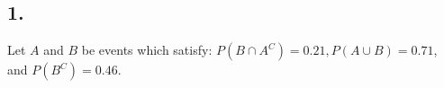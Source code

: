 

\renewcommand\assignment{Worksheet 7, due Friday 3 February, 4:15pm}

\def\firstcircle{(0:1.75cm) circle (2.5cm)}
\def\secondcircle{(180:1.75cm) circle (2.5cm)}



    \subsection*{1.}
    Let $A$ and $B$ be events which satisfy: $P (B \cap A^C) = 0.21, P (A \cup B) = 0.71$, and $P (B^C) = 0.46$.


